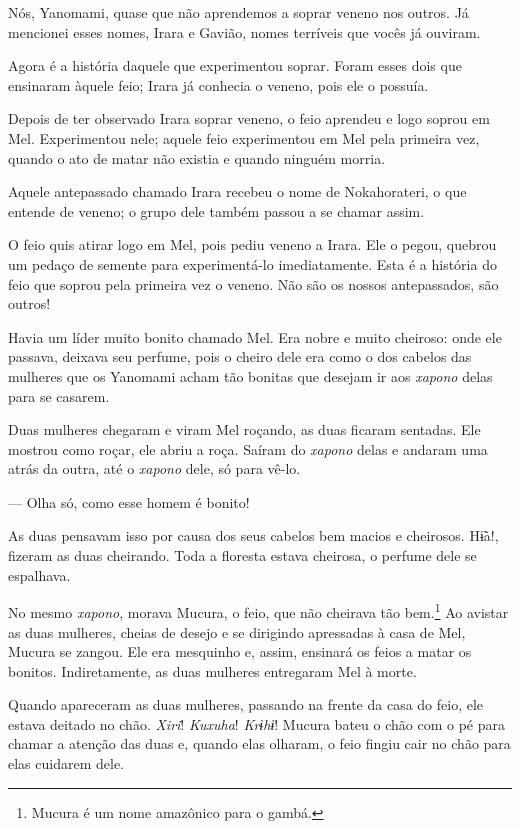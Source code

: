 Nós, Yanomami, quase que não aprendemos a soprar veneno nos outros. Já
mencionei esses nomes, Irara e Gavião, nomes terríveis que vocês já
ouviram. 

Agora é a história daquele que experimentou soprar. Foram esses dois que
ensinaram àquele feio; Irara já conhecia o veneno, pois ele o possuía. 

Depois de ter observado Irara soprar veneno, o feio aprendeu e logo
soprou em Mel. Experimentou nele; aquele feio experimentou em Mel pela
primeira vez, quando o ato de matar não existia e quando ninguém
morria. 

Aquele antepassado chamado Irara recebeu o nome de Nokahorateri, o que
entende de veneno; o grupo dele também passou a se chamar assim. 

O feio quis atirar logo em Mel, pois pediu veneno a Irara. Ele o pegou,
quebrou um pedaço de semente para experimentá-lo imediatamente. Esta é a
história do feio que soprou pela primeira vez o veneno. Não são os
nossos antepassados, são outros! 

Havia um líder muito bonito chamado Mel. Era nobre e muito cheiroso:
onde ele passava, deixava seu perfume, pois o cheiro dele era como o dos
cabelos das mulheres que os Yanomami acham tão bonitas que desejam
ir aos \textit{xapono} delas para se casarem.

Duas mulheres chegaram e viram Mel roçando, as duas ficaram sentadas. Ele
mostrou como roçar, ele abriu a roça. Saíram do \textit{xapono} delas e andaram uma
atrás da outra, até o \textit{xapono} dele, só para vê-lo. 

--- Olha só, como esse homem é bonito! 

As duas pensavam isso por causa dos seus cabelos bem macios e
cheirosos. Hɨ̃a!, fizeram as duas cheirando. Toda a floresta
estava cheirosa, o perfume dele se espalhava. 

No mesmo \textit{xapono}, morava Mucura, o feio, que não cheirava tão bem.\footnote{Mucura é um nome amazônico para o gambá.} Ao avistar as duas mulheres, cheias de desejo e se
dirigindo apressadas à casa de Mel, Mucura se zangou. Ele era mesquinho
e, assim, ensinará os feios a matar os bonitos. Indiretamente, as
duas mulheres entregaram Mel à morte. 

Quando apareceram as duas mulheres, passando na frente da casa do feio,
ele estava deitado no chão. \textit{Xiri}! \textit{Kuxuha}! \textit{Krɨhɨ}! Mucura bateu o chão com o pé para chamar a atenção das duas e, quando elas olharam, o feio fingiu cair no chão para elas cuidarem dele.

